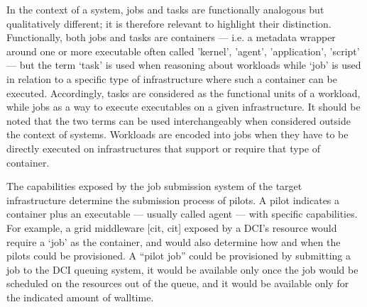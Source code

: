 \documentclass{sig-alternate}
\begin{document}
In the context of a \pilotjob system, jobs and tasks are functionally analogous
but qualitatively different; it is therefore relevant to highlight their
distinction. Functionally, both jobs and tasks are containers --- i.e. a
metadata wrapper around one or more executable often called 'kernel', 'agent',
'application', 'script' --- but the term `task' is used when reasoning about
workloads while `job' is used in relation to a specific type of infrastructure
where such a container can be executed. Accordingly, tasks are considered as the
functional units of a workload, while jobs as a way to execute executables on a
given infrastructure. It should be noted that the two terms can be used
interchangeably when considered outside the context of \pilotjob systems.
 Workloads are encoded into jobs when they have to be
directly executed on infrastructures that support or require that type of
container.

The capabilities exposed by the job submission system of the target
infrastructure determine the submission process of pilots. A pilot indicates a
container plus an executable --- usually called agent --- with  specific
capabilities. For example, a grid middleware [cit, cit] exposed by a DCI's
resource would require a `job' as the \pilot container, and  would also
determine how and when the pilots could be provisioned. A ``pilot job'' could be
provisioned by submitting a job to the DCI queuing system, it would be available
only once the job would be scheduled on the resources out of the queue, and it
would be available only for the indicated amount of walltime. 

\end{document}
